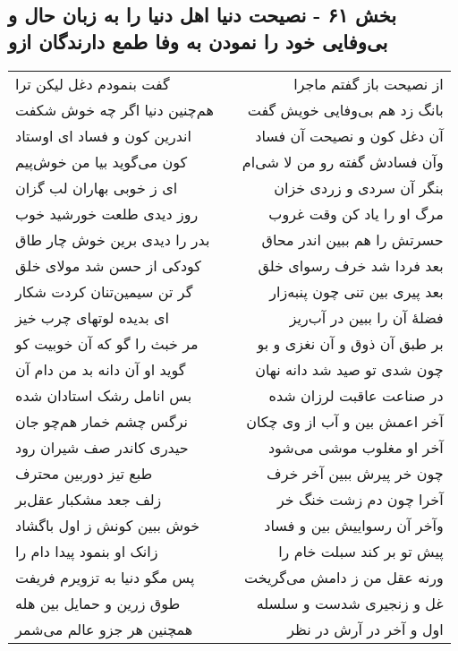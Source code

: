 \begin{center}
\section*{بخش ۶۱ - نصیحت دنیا اهل دنیا را به زبان حال و بی‌وفایی خود را نمودن  به وفا طمع دارندگان ازو}
\label{sec:sh061}
\begin{longtable}{l p{0.5cm} r}
گفت بنمودم دغل لیکن ترا
&&
از نصیحت باز گفتم ماجرا
\\
هم‌چنین دنیا اگر چه خوش شکفت
&&
بانگ زد هم بی‌وفایی خویش گفت
\\
اندرین کون و فساد ای اوستاد
&&
آن دغل کون و نصیحت آن فساد
\\
کون می‌گوید بیا من خوش‌پیم
&&
وآن فسادش گفته رو من لا شی‌ام
\\
ای ز خوبی بهاران لب گزان
&&
بنگر آن سردی و زردی خزان
\\
روز دیدی طلعت خورشید خوب
&&
مرگ او را یاد کن وقت غروب
\\
بدر را دیدی برین خوش چار طاق
&&
حسرتش را هم ببین اندر محاق
\\
کودکی از حسن شد مولای خلق
&&
بعد فردا شد خرف رسوای خلق
\\
گر تن سیمین‌تنان کردت شکار
&&
بعد پیری بین تنی چون پنبه‌زار
\\
ای بدیده لوتهای چرب خیز
&&
فضلهٔ آن را ببین در آب‌ریز
\\
مر خبث را گو که آن خوبیت کو
&&
بر طبق آن ذوق و آن نغزی و بو
\\
گوید او آن دانه بد من دام آن
&&
چون شدی تو صید شد دانه نهان
\\
بس انامل رشک استادان شده
&&
در صناعت عاقبت لرزان شده
\\
نرگس چشم خمار هم‌چو جان
&&
آخر اعمش بین و آب از وی چکان
\\
حیدری کاندر صف شیران رود
&&
آخر او مغلوب موشی می‌شود
\\
طبع تیز دوربین محترف
&&
چون خر پیرش ببین آخر خرف
\\
زلف جعد مشکبار عقل‌بر
&&
آخرا چون دم زشت خنگ خر
\\
خوش ببین کونش ز اول باگشاد
&&
وآخر آن رسواییش بین و فساد
\\
زانک او بنمود پیدا دام را
&&
پیش تو بر کند سبلت خام را
\\
پس مگو دنیا به تزویرم فریفت
&&
ورنه عقل من ز دامش می‌گریخت
\\
طوق زرین و حمایل بین هله
&&
غل و زنجیری شدست و سلسله
\\
همچنین هر جزو عالم می‌شمر
&&
اول و آخر در آرش در نظر
\\

\end{longtable}
\end{center}

